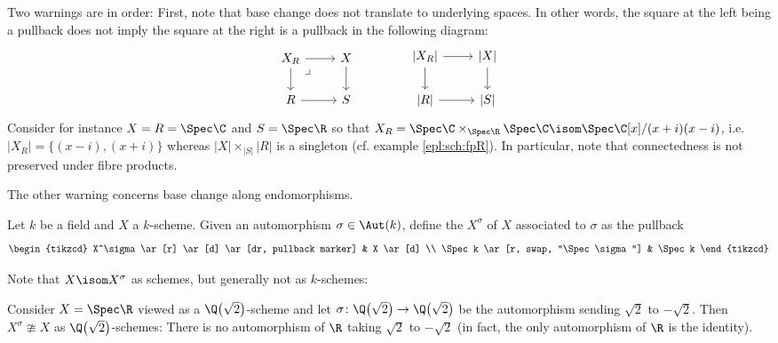 \documentclass[wip, algebra]{bsteffan-lecturenotes}
\renewcommand{\P}{\mathbb{P}}
\newcommand{\nisom}{\ncong}
\begin{document}
Two warnings are in order: 
First, note that base change does not translate to underlying spaces.
In other words, the square at the left being a pullback does not imply the square at the right is a pullback in the following diagram:
\begin{equation*}
	\begin{tikzcd}
		X_R
				\ar[r]
				\ar[d]
				\ar[dr, phantom, "\lrcorner" very near start]
			& X
				\ar[d]
		\\
		R 
				\ar[r]
			& S
	\end{tikzcd}
	\qquad\qquad
	\begin{tikzcd}
		{|X_R|}
				\ar[r]
				\ar[d]
			& {|X|}
				\ar[d]
		\\
		{|R|}
				\ar[r]
			& {|S|}
	\end{tikzcd}
\end{equation*}
Consider for instance $X = R = \Spec \C$ and $S = \Spec \R$ so that $X_R = \Spec \C \times_{\Spec \R} \Spec \C \isom \Spec \C[x] / (x + i)(x - i)$, i.e. $|X_R| = \{(x - i), (x + i)\}$ whereas $|X| \times_{|S|} |R|$ is a singleton (cf. example \ref{epl:sch:fpR}).
In particular, note that connectedness is not preserved under fibre products.

The other warning concerns base change along endomorphisms.
\begin{definition}
	Let $k$ be a field and $X$ a $k$-scheme.
	Given an automorphism $\sigma \in \Aut(k)$, define the  $X^\sigma$ of $X$ associated to $\sigma$ as the pullback
	\begin{equation*}
		\begin{tikzcd}
			X^\sigma
					\ar[r]
					\ar[d]
					\ar[dr, pullback marker]
				& X
					\ar[d]
			\\
			\Spec k
					\ar[r, swap, "\Spec \sigma"]
				& \Spec k
		\end{tikzcd}
	\end{equation*}
\end{definition}
Note that $X \isom X^\sigma$ as schemes, but generally not as $k$-schemes:
\begin{example}
	Consider $X = \Spec \R$ viewed as a $\Q\big(\sqrt{2}\big)$-scheme and let $\sigma\colon \Q\big(\sqrt{2}\big) \to \Q\big(\sqrt{2}\big)$ be the automorphism sending $\sqrt{2}$ to $-\sqrt{2}$.
	Then $X^\sigma \nisom X$ as $\Q\big(\sqrt{2}\big)$-schemes:
	There is no automorphism of $\R$ taking $\sqrt{2}$ to $-\sqrt{2}$ (in fact, the only automorphism of $\R$ is the identity).
\end{example}
\end{document}
